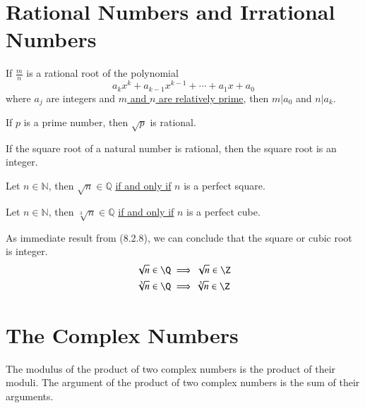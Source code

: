 \documentclass[11pt]{article}
\begin{document}
	\section{Rational Numbers and Irrational Numbers}
		\begin{theorem}
			If $\frac{m}{n}$ is a rational root of the polynomial
			\[
				a_k x^k + a_{k-1} x^{k-1} + \cdots + a_1 x + a_0
			\]
			where $a_j$ are integers and \ul{$m$ and $n$ are relatively prime}, then $m | a_0$ and $n | a_k$.
		\end{theorem}
		
		\begin{theorem}[8.2.6]
			If $p$ is a prime number, then $\sqrt{p}$ is rational.
		\end{theorem}
		
		\begin{theorem}[8.2.8]
			If the square root of a natural number is rational, then the square root is an integer.
		\end{theorem}
		
		\begin{theorem}[Extended 8.2.8]
			Let $n \in \mathbb{N}$, then $\sqrt{n} \in \mathbb{Q}$ \ul{if and only if} $n$ is a perfect square.
		\end{theorem}
		
		\begin{theorem}[Extended 8.2.8]
			Let $n \in \mathbb{N}$, then $\sqrt[3]{n} \in \mathbb{Q}$ \ul{if and only if} $n$ is a perfect cube.
		\end{theorem}
		
		\begin{remark}
			As immediate result from (8.2.8), we can conclude that the square or cubic root is integer.
			\begin{gather*}
				\sqrt{n} \in \Q \implies \sqrt{n} \in \Z \\
				\sqrt[3]{n} \in \Q \implies \sqrt[3]{n} \in \Z
			\end{gather*}
		\end{remark}
		
	
	\section{The Complex Numbers}
		\begin{theorem}[9.2.3]
			The modulus of the product of two complex numbers is the product of their moduli. The argument of the product of two complex numbers is the sum of their arguments.
		\end{theorem}
		
\end{document}
